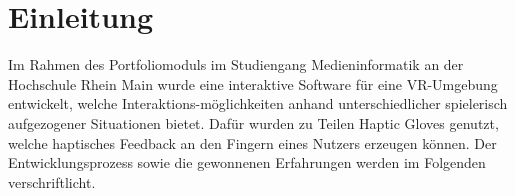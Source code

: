 \chapter{Einleitung}
Im Rahmen des Portfoliomoduls im Studiengang Medieninformatik an der Hochschule Rhein Main wurde eine interaktive Software für eine VR-Umgebung entwickelt, welche Interaktions-möglichkeiten anhand unterschiedlicher spielerisch aufgezogener Situationen bietet. Dafür wurden zu Teilen \dq Haptic Gloves \dq genutzt, welche haptisches Feedback an den Fingern eines Nutzers erzeugen können. Der Entwicklungsprozess sowie die gewonnenen Erfahrungen werden im Folgenden verschriftlicht.